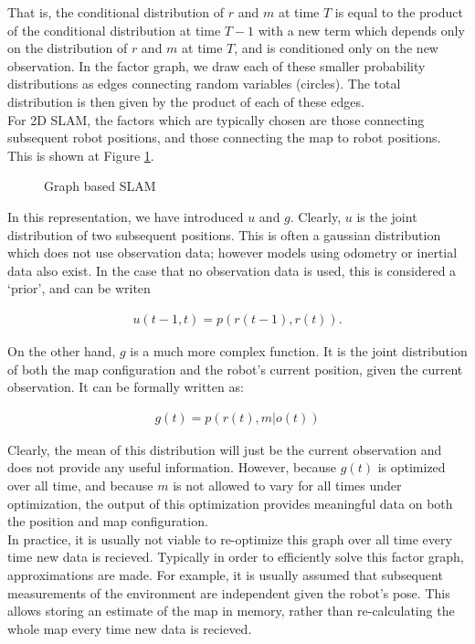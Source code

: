 \documentclass[capstone_report.tex]{subfiles}
\begin{document}
That is, the conditional distribution of $r$ and $m$ at time $T$ is equal to the product of the conditional distribution at time $T-1$ with a new term which depends only on the distribution of $r$ and $m$ at time $T$, and is conditioned only on the new observation. In the factor graph, we draw each of these smaller probability distributions as edges connecting random variables (circles). The total distribution is then given by the product of each of these edges.\\ 

For 2D SLAM, the factors which are typically chosen are those connecting subsequent robot positions, and those connecting the map to robot positions. This is shown at Figure \ref{fig:graphSlam1}.

\begin{figure}[H]
\centering
  
  \caption{Graph based SLAM\label{fig:graphSlam1}}
\end{figure}

In this representation, we have introduced $u$ and $g$. Clearly, $u$ is the joint distribution of two subsequent positions. This is often a gaussian distribution which does not use observation data; however models using odometry or inertial data also exist. In the case that no observation data is used, this is considered a `prior', and can be writen

\begin{align*}
    u(t-1,t) = p(r(t-1), r(t)). 
\end{align*}

On the other hand, $g$ is a much more complex function. It is the joint distribution of both the map configuration and the robot's current position, given the current observation. It can be formally written as: 

\begin{align*}
  g(t) = p(r(t),m | o(t))
\end{align*}

Clearly, the mean of this distribution will just be the current observation and does not provide any useful information. However, because $g(t)$ is optimized over all time, and because $m$ is not allowed to vary for all times under optimization, the output of this optimization provides meaningful data on both the position and map configuration.\\

In practice, it is usually not viable to re-optimize this graph over all time every time new data is recieved. Typically in order to efficiently solve this factor graph, approximations are made. For example, it is usually assumed that subsequent measurements of the environment are independent given the robot's pose. This allows storing an estimate of the map in memory, rather than re-calculating the whole map every time new data is recieved.\\
\end{document}
